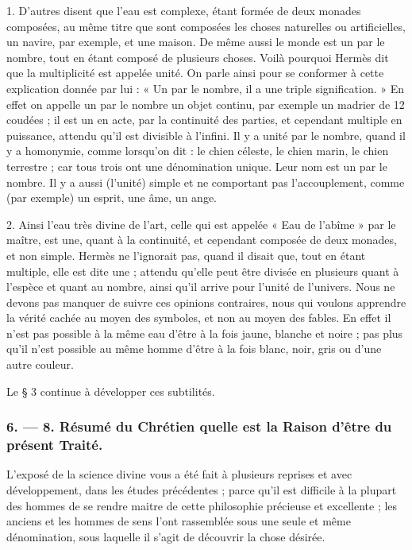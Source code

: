\documentclass[a4paper, 11pt, oneside, polutonikogreek, french]{article}
\begin{document}
1. D'autres disent que l'eau est complexe, étant formée de deux monades composées, au même titre que sont composées les choses naturelles ou artificielles, un navire, par exemple, et une maison. De même aussi le monde est un par le nombre, tout en étant composé de plusieurs choses. Voilà pourquoi Hermès dit que la multiplicité est appelée unité. On parle ainsi pour se conformer à cette explication donnée par lui : « Un par le nombre, il a une triple signification. » En effet on appelle un par le nombre un objet continu, par exemple un madrier de 12 coudées ; il est un en acte, par la continuité des parties, et cependant multiple en puissance, attendu qu'il est divisible à l'infini. Il y a unité par le nombre, quand il y a homonymie, comme lorsqu'on dit : le chien céleste, le chien marin, le chien terrestre ; car tous trois ont une dénomination unique. Leur nom est un par le nombre. Il y a aussi (l'unité) simple et ne comportant pas l'accouplement, comme (par exemple) un esprit, une âme, un ange.

2. Ainsi l'eau très divine de l'art, celle qui est appelée « Eau de l'abîme » par le maître, est une, quant à la continuité, et cependant composée de deux monades, et non simple. Hermès ne l'ignorait pas, quand il disait que, tout en étant multiple, elle est dite une ; attendu qu'elle peut être divisée en plusieurs quant à l'espèce et quant au nombre, ainsi qu'il arrive pour l'unité de l'univers. Nous ne devons pas manquer de suivre ces opinions contraires, nous qui voulons apprendre la vérité cachée au moyen des symboles, et non au moyen des fables. En effet il n'est pas possible à la même eau d'être à la fois jaune, blanche et noire ; pas plus qu'il n'est possible au même homme d'être à la fois blanc, noir, gris ou d'une autre couleur.

Le § 3 continue à développer ces subtilités.

\bigskip
\centerline{\EightStarTaper}
\centerline{\EightStarTaper\EightStarTaper}
\bigskip

\subsubsection{6. --- 8. Résumé du Chrétien quelle est la Raison d'être du présent Traité.}

L'exposé de la science divine vous a été fait à plusieurs reprises et avec développement, dans les études précédentes ; parce qu'il est difficile à la plupart des hommes de se rendre maitre de cette philosophie précieuse et excellente ; les anciens et les hommes de sens l'ont rassemblée sous une seule et même dénomination, sous laquelle il s'agit de découvrir la chose désirée.
\end{document}
